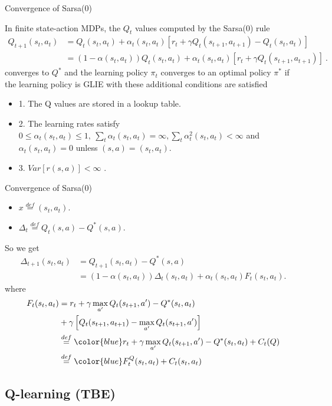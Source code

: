 \documentclass{beamer}
\newcommand{\blue}[1]{{\color{blue} #1}}
\begin{document}
\begin{frame}{Convergence of Sarsa(0)}
	\begin{theorem}
		In finite state-action MDPs, the $Q_t$ values computed by the Sarsa(0) rule
		\small{
		\begin{equation}\nonumber
		\begin{aligned}
			Q_{t+1}(s_t, a_t) &= Q_t(s_t, a_t) + \alpha_t(s_t, a_t)[r_t + \gamma Q_t(s_{t+1}, a_{t+1}) - Q_t(s_t, a_t)] \\
			&= (1-\alpha(s_t, a_t)) Q_t(s_t, a_t) + \alpha_t(s_t, a_t)[r_t + \gamma Q_t(s_{t+1}, a_{t+1})] ~.
		\end{aligned}
		\end{equation}
		}
		converges to $Q^*$ and the learning policy $\pi_t$ converges to an optimal policy $\pi^*$ if the learning policy is GLIE with these additional conditions are satisfied
		\begin{itemize}
			\item 1. The Q values are stored in a lookup table.
			\item 2. The learning rates satisfy $0 \leq \alpha_t(s_t, a_t) \leq 1, ~\sum_t \alpha_t(s_t, a_t) = \infty, \sum_t \alpha_t^2(s_t, a_t) < \infty$ and $\alpha_t(s_t, a_t) = 0$ unless $(s, a) = (s_t, a_t)$.
			\item 3. $Var[r(s,a)] < \infty$ .
		\end{itemize}
	\end{theorem}
\end{frame}


\begin{frame}{Convergence of Sarsa(0)}
\begin{itemize}
	\item $x \overset{def}{=} (s_t, a_t)$.
	\item $\Delta_{t} \overset{def}{=} Q_t(s, a) - Q^*(s,a)$.
\end{itemize}
So we get
\begin{equation}
\begin{aligned}
	\Delta_{t+1}(s_t, a_t) &= Q_{t+1}(s_t, a_t) - Q^*(s,a) \\
	&= (1-\alpha(s_t, a_t)) \Delta_{t}(s_t, a_t) + \alpha_t(s_t, a_t)F_t(s_t, a_t).
\end{aligned}
\end{equation}
where
\begin{equation}
\begin{aligned}
	F_t(s_t, a_t) &= r_t + \gamma \max_{a'} Q_t(s_{t+1}, a') - Q^*(s_t, a_t) \\
	& + \gamma \left[ Q_t(s_{t+1}, a_{t+1}) - \max_{a'} Q_t(s_{t+1}, a') \right] \\
	& \overset{def}{=} \blue{r_t + \gamma \max_{a'} Q_t(s_{t+1}, a') - Q^*(s_t, a_t)} + C_t(Q) \\
	& \overset{def}{=} \blue{F_t^Q(s_t,a_t)} + C_t(s_t, a_t)
\end{aligned}
\end{equation}
\end{frame}


\subsection{Q-learning (TBE)}
\end{document}
